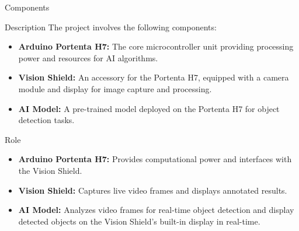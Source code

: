 \begin{frame}{Components}
	
	
	\begin{block}{Description}
	The project involves the following components:
	\begin{itemize}
		\item \textbf{Arduino Portenta H7:} The core microcontroller unit providing processing power and resources for AI algorithms.
		\item \textbf{Vision Shield:} An accessory for the Portenta H7, equipped with a camera module and display for image capture and processing.
		\item \textbf{AI Model:} A pre-trained model deployed on the Portenta H7 for object detection tasks.
	\end{itemize}
\end{block}

\end{frame}

\begin{frame}

\begin{block}{Role}
	\begin{itemize}
		\item \textbf{Arduino Portenta H7:} Provides computational power and interfaces with the Vision Shield.
		\item \textbf{Vision Shield:} Captures live video frames and displays annotated results.
		\item \textbf{AI Model:} Analyzes video frames for real-time object detection and display detected objects on the Vision Shield's built-in display in real-time.
	\end{itemize}
\end{block}

  \nocite{*}

{\tiny 
	\printbibliography %
}

\end{frame}